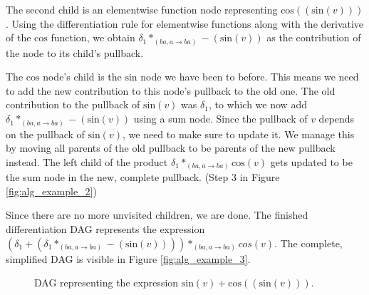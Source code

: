 \documentclass[12pt, a4paper]{report}
\begin{document}
The second child is an elementwise function node representing $\text{cos}((\text{sin}(v)))$.
Using the differentiation rule for elementwise functions along with the derivative of the $\text{cos}$ function, we obtain $\delta_1 *_{(ba,a \rightarrow ba)} -(\text{sin}(v))$ as the contribution of the node to its child's pullback.

The $\text{cos}$ node's child is the $\text{sin}$ node we have been to before.
This means we need to add the new contribution to this node's pullback to the old one.
The old contribution to the pullback of $\text{sin}(v)$ was $\delta_1$, to which we now add $\delta_1 *_{(ba,a \rightarrow ba)} -(\text{sin}(v))$ using a sum node.
Since the pullback of $v$ depends on the pullback of $\text{sin}(v)$, we need to make sure to update it.
We manage this by moving all parents of the old pullback to be parents of the new pullback instead.
The left child of the product $\delta_1 *_{(ba,a \rightarrow ba)} \text{cos}(v)$ gets updated to be the sum node in the new, complete pullback. (Step 3 in Figure \ref{fig:alg_example_2})

Since there are no more unvisited children, we are done.
The finished differentiation DAG represents the expression $(\delta_1 + (\delta_1 *_{(ba,a \rightarrow ba)} -(\text{sin}(v)))) *_{(ba,a \rightarrow ba)} cos(v)$.
The complete, simplified DAG is visible in Figure \ref{fig:alg_example_3}.

\begin{figure}
    \centering
    \caption{DAG representing the expression $\text{sin}(v) + \text{cos}((\text{sin}(v)))$.}
    \label{fig:alg_example_1}
\end{figure}
\end{document}
